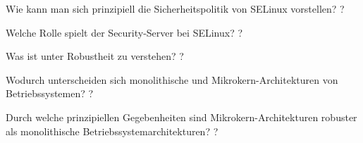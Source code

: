 \documentclass[avery5371]{flashcards}
\begin{document}
\begin{flashcard}{Wie kann man sich prinzipiell die Sicherheitspolitik von SELinux vorstellen?}
    ?
\end{flashcard}

\begin{flashcard}{Welche Rolle spielt der Security-Server bei SELinux?}
    ?
\end{flashcard}

\begin{flashcard}{Was ist unter Robustheit zu verstehen?}
    ?
\end{flashcard}

\begin{flashcard}{Wodurch unterscheiden sich monolithische und Mikrokern-Architekturen von Betriebssystemen?}
    ?
\end{flashcard}

\begin{flashcard}{Durch welche prinzipiellen Gegebenheiten sind Mikrokern-Architekturen robuster als monolithische Betriebssystemarchitekturen?}
    ?
\end{flashcard}
\end{document}

